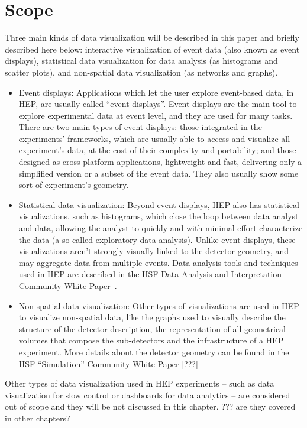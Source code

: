 \documentclass[12pt,a4paper]{article}
\begin{document}
\hypertarget{scope}{%
\section{Scope}\label{scope}}

Three main kinds of data visualization will be described in this paper and briefly described here below:
interactive visualization of event data (also known as event displays), statistical data visualization for
data analysis (as histograms and scatter plots), and non-spatial data visualization (as networks and graphs).

\begin{itemize}
\item Event displays: Applications which let the user explore event-based data, in HEP, are usually
called “event displays”. Event displays are the main tool to explore experimental data at event level,
and they are used for many tasks. There are two main types of event displays:
those integrated in the experiments’ frameworks, which are usually able to access and visualize
all experiment’s data, at the cost of their complexity and portability; and those designed as cross-platform
  applications, lightweight and fast, delivering only a simplified version or a subset of the event data.
  They also usually show some sort of experiment’s geometry.
\item Statistical data visualization: Beyond event displays, HEP also has statistical visualizations,
such as histograms, which close the loop between data analyst and data, allowing the analyst to quickly
and with minimal effort characterize the data (a so called exploratory data analysis).
Unlike event displays, these visualizations aren’t strongly visually linked to the detector geometry,
and may aggregate data from multiple events. Data analysis tools and techniques used in HEP are
described in the HSF Data Analysis and Interpretation Community White Paper~\cite{DataAnalysisCWP2017}.
\item Non-spatial data visualization: Other types of visualizations are used in HEP to
visualize non-spatial data, like the graphs used to visually describe the structure of the detector description,
the representation of all geometrical volumes that compose the sub-detectors and the infrastructure of a HEP experiment.
More details about the detector geometry can be found in the HSF “Simulation” Community White Paper [???]
\end{itemize}

Other types of data visualization used in HEP experiments -- such as data visualization for slow control
or dashboards for data analytics -- are considered out of scope and they will be not discussed in this chapter.
??? are they covered in other chapters?
\end{document}

